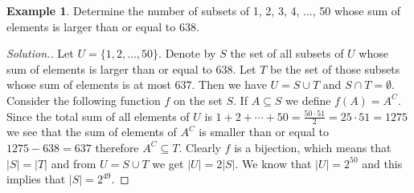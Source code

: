 \documentclass[11pt]{article}
\theoremstyle{definition}
\newtheorem{exmp}[thm]{Example}
\theoremstyle{plain}
\begin{document}
\begin{exmp}
Determine the number of subsets of {1, 2, 3, 4, ..., 50} whose sum of elements is larger than or equal to 638.
\end{exmp}
\begin{proof}[Solution.]
Let \( U=\{1,2,\dots, 50\} \). Denote by \( S \) the set of all subsets of \( U \) whose sum of elements is larger than or equal to \( 638 \). Let \( T \) be the set of those subsets whose sum of elements is at most \( 637 \). Then we have \( U=S\cup T \) and \( S\cap T=\emptyset \). Consider the following function \( f \) on the set \( S \). If \( A\subseteq S \) we define \( f(A)=A^C \). Since the total sum of all elements of \( U \) is \( 1+2+\cdots+ 50=\frac{50\cdot 51}2=25\cdot 51=1275 \) we see that the sum of elements of \( A^C \) is smaller than or equal to \( 1275-638=637 \) therefore \( A^C\subseteq T \). Clearly \( f \) is a bijection, which means that \( |S|=|T| \) and from \( U=S\cup T \) we get \( |U|=2|S| \). We know that \( |U|=2^{50} \) and this implies that \( |S|=2^{49} \).
\end{proof}
\end{document}
